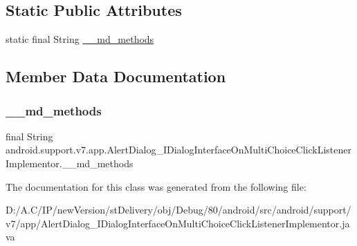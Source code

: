\subsection*{Static Public Attributes}
\begin{DoxyCompactItemize}
\item 
static final String \hyperlink{classandroid_1_1support_1_1v7_1_1app_1_1_alert_dialog___i_dialog_interface_on_multi_choice_click_listener_implementor_a0883fdfc11be8aa3d8e24db60ec91986}{\+\_\+\+\_\+md\+\_\+methods}
\end{DoxyCompactItemize}


\subsection{Member Data Documentation}
\mbox{\label{classandroid_1_1support_1_1v7_1_1app_1_1_alert_dialog___i_dialog_interface_on_multi_choice_click_listener_implementor_a0883fdfc11be8aa3d8e24db60ec91986}} 
\subsubsection{\texorpdfstring{\+\_\+\+\_\+md\+\_\+methods}{\_\_md\_methods}}
{\footnotesize\ttfamily final String android.\+support.\+v7.\+app.\+Alert\+Dialog\+\_\+\+I\+Dialog\+Interface\+On\+Multi\+Choice\+Click\+Listener\+Implementor.\+\_\+\+\_\+md\+\_\+methods\hspace{0.3cm}{\ttfamily [static]}}



The documentation for this class was generated from the following file\+:\begin{DoxyCompactItemize}
\item 
D\+:/\+A.\+C/\+I\+P/new\+Version/st\+Delivery/obj/\+Debug/80/android/src/android/support/v7/app/Alert\+Dialog\+\_\+\+I\+Dialog\+Interface\+On\+Multi\+Choice\+Click\+Listener\+Implementor.\+java\end{DoxyCompactItemize}
